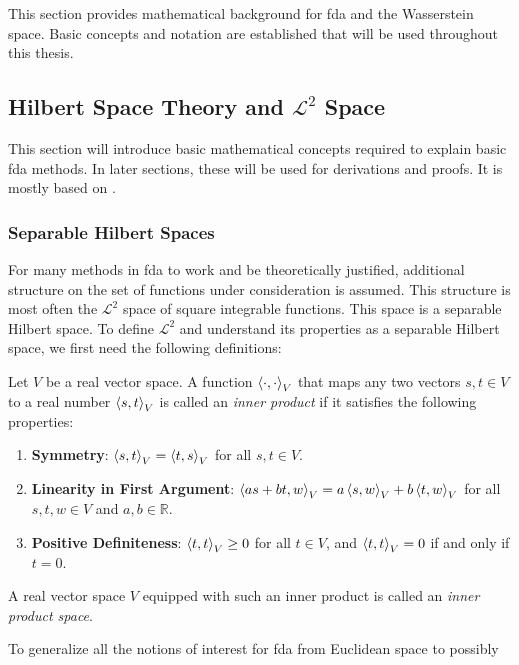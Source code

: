 This section provides mathematical background for fda and the Wasserstein space. Basic
concepts and notation are established that will be used throughout this thesis.

\subsection{Hilbert Space Theory and $\mathcal{L}^2$ Space}
\label{sec:hilbert spaces and l2}
This section will introduce basic mathematical concepts required to explain basic fda
methods. In later sections, these will be used for derivations and proofs. It is mostly
based on \textcite[Chapter~2]{HsingEubank2015}.

\subsubsection{Separable Hilbert Spaces}
\label{sec:separable hilbert spaces}
For many methods in fda to work and be theoretically justified, additional structure on
the set of functions under consideration is assumed. This structure is most often the
$\mathcal{L}^2$ space of square integrable functions. This space is a separable Hilbert
space. To define $\mathcal{L}^2$ and understand its properties as a separable Hilbert
space, we first need the following definitions:
\begin{definition}
    \label{def:inpr}
    Let \( V \) be a real vector space. A function $\left \langle \cdot, \cdot \right \rangle_V$ that maps any
    two vectors \( s, t \in V \) to a real number \( \left \langle s, t \right \rangle_V \) is called an
    \textit{inner product} if it satisfies the following properties:
    \begin{enumerate}
        \item \textbf{Symmetry}: \( \left \langle s, t \right \rangle_V  = \left \langle t, s \right \rangle_V \) for all \( s, t \in V \).
        \item \textbf{Linearity in First Argument}: \( \left \langle as + bt, w \right \rangle_V = a \left \langle s, w \right \rangle_V + b \left \langle t, w \right \rangle_V \) for all \( s, t, w \in V \) and \( a, b \in \mathbb{R} \).
        \item \textbf{Positive Definiteness}: \( \left \langle t, t \right \rangle_V \geq 0 \) for all \( t \in V \), and \( \left \langle t, t \right \rangle_V = 0 \) if and only if \( t = 0 \).
    \end{enumerate}
    A real vector space \( V \) equipped with such an inner product is called an
    \textit{inner product space}.
\end{definition}
To generalize all the notions of interest for fda from Euclidean space to possibly
